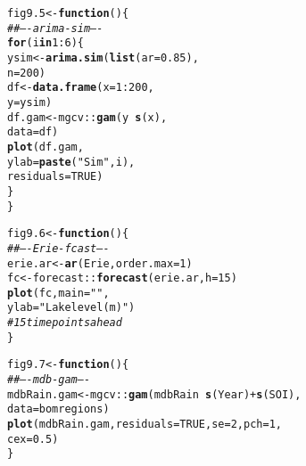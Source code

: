 \documentclass[12pt, a4paper,  BCOR=8.25mm, DIV=15]{scrartcl}\usepackage[]{graphicx}\usepackage[]{color}
\makeatletter
\newcommand{\hlnum}[1]{\textcolor[rgb]{0.686,0.059,0.569}{#1}}%
\newcommand{\hlstr}[1]{\textcolor[rgb]{0.192,0.494,0.8}{#1}}%
\newcommand{\hlcom}[1]{\textcolor[rgb]{0.678,0.584,0.686}{\textit{#1}}}%
\newcommand{\hlopt}[1]{\textcolor[rgb]{0,0,0}{#1}}%
\newcommand{\hlstd}[1]{\textcolor[rgb]{0.345,0.345,0.345}{#1}}%
\newcommand{\hlkwa}[1]{\textcolor[rgb]{0.161,0.373,0.58}{\textbf{#1}}}%
\newcommand{\hlkwb}[1]{\textcolor[rgb]{0.69,0.353,0.396}{#1}}%
\newcommand{\hlkwc}[1]{\textcolor[rgb]{0.333,0.667,0.333}{#1}}%
\newcommand{\hlkwd}[1]{\textcolor[rgb]{0.737,0.353,0.396}{\textbf{#1}}}%
\newenvironment{kframe}{%
 \def\at@end@of@kframe{}%
 \ifinner\ifhmode%
  \def\at@end@of@kframe{\end{minipage}}%
  \begin{minipage}{\columnwidth}%
 \fi\fi%
 \def\FrameCommand##1{\hskip\@totalleftmargin \hskip-\fboxsep
 \colorbox{shadecolor}{##1}\hskip-\fboxsep
     \hskip-\linewidth \hskip-\@totalleftmargin \hskip\columnwidth}%
 \MakeFramed {\advance\hsize-\width
   \@totalleftmargin\z@ \linewidth\hsize
   \@setminipage}}%
 {\par\unskip\endMakeFramed%
 \at@end@of@kframe}
\newenvironment{knitrout}{}{} %
\makeatother
\begin{document}
\begin{knitrout}
\color{fgcolor}\begin{kframe}
\begin{alltt}
\hlstd{fig9.5} \hlkwb{<-} \hlkwa{function}\hlstd{()\{}
\hlcom{## ---- arima-sim ----}
\hlkwa{for} \hlstd{(i} \hlkwa{in} \hlnum{1}\hlopt{:}\hlnum{6}\hlstd{)\{}
\hlstd{ysim} \hlkwb{<-} \hlkwd{arima.sim}\hlstd{(}\hlkwd{list}\hlstd{(}\hlkwc{ar}\hlstd{=}\hlnum{0.85}\hlstd{),}
                  \hlkwc{n}\hlstd{=}\hlnum{200}\hlstd{)}
\hlstd{df} \hlkwb{<-} \hlkwd{data.frame}\hlstd{(}\hlkwc{x}\hlstd{=}\hlnum{1}\hlopt{:}\hlnum{200}\hlstd{,}
                 \hlkwc{y}\hlstd{=ysim)}
\hlstd{df.gam} \hlkwb{<-} \hlstd{mgcv}\hlopt{::}\hlkwd{gam}\hlstd{(y} \hlopt{~} \hlkwd{s}\hlstd{(x),}
              \hlkwc{data}\hlstd{=df)}
\hlkwd{plot}\hlstd{(df.gam,}
     \hlkwc{ylab}\hlstd{=}\hlkwd{paste}\hlstd{(}\hlstr{"Sim"}\hlstd{, i),}
     \hlkwc{residuals}\hlstd{=}\hlnum{TRUE}\hlstd{)}
\hlstd{\}}
\hlstd{\}}
\end{alltt}
\end{kframe}
\end{knitrout}

\begin{knitrout}
\color{fgcolor}\begin{kframe}
\begin{alltt}
\hlstd{fig9.6} \hlkwb{<-} \hlkwa{function}\hlstd{()\{}
\hlcom{## ---- Erie-fcast ----}
\hlstd{erie.ar} \hlkwb{<-} \hlkwd{ar}\hlstd{(Erie,} \hlkwc{order.max}\hlstd{=}\hlnum{1}\hlstd{)}
\hlstd{fc} \hlkwb{<-} \hlstd{forecast}\hlopt{::}\hlkwd{forecast}\hlstd{(erie.ar,} \hlkwc{h}\hlstd{=}\hlnum{15}\hlstd{)}
\hlkwd{plot}\hlstd{(fc,} \hlkwc{main}\hlstd{=}\hlstr{""}\hlstd{,}
     \hlkwc{ylab}\hlstd{=}\hlstr{"Lake level (m)"}\hlstd{)}
  \hlcom{# 15 time points ahead}
\hlstd{\}}
\end{alltt}
\end{kframe}
\end{knitrout}

\begin{knitrout}
\color{fgcolor}\begin{kframe}
\begin{alltt}
\hlstd{fig9.7} \hlkwb{<-} \hlkwa{function}\hlstd{()\{}
\hlcom{## ---- mdb-gam ----}
\hlstd{mdbRain.gam} \hlkwb{<-} \hlstd{mgcv}\hlopt{::}\hlkwd{gam}\hlstd{(mdbRain} \hlopt{~} \hlkwd{s}\hlstd{(Year)} \hlopt{+} \hlkwd{s}\hlstd{(SOI),}
                   \hlkwc{data}\hlstd{=bomregions)}
\hlkwd{plot}\hlstd{(mdbRain.gam,} \hlkwc{residuals}\hlstd{=}\hlnum{TRUE}\hlstd{,} \hlkwc{se}\hlstd{=}\hlnum{2}\hlstd{,} \hlkwc{pch}\hlstd{=}\hlnum{1}\hlstd{,}
     \hlkwc{cex}\hlstd{=}\hlnum{0.5}\hlstd{)}
\hlstd{\}}
\end{alltt}
\end{kframe}
\end{knitrout}
\end{document}
